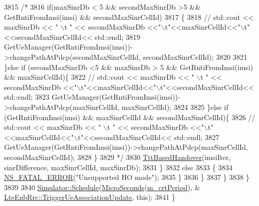 \begin{DoxyCode}
3815                 \textcolor{comment}{/*}
3816 \textcolor{comment}{                if(maxSinrDb < 5 && secondMaxSinrDb >5 && GetRntiFromImsi(imsi) && secondMaxSinrCellId)}
3817 \textcolor{comment}{                \{}
3818 \textcolor{comment}{                //      std::cout << maxSinrDb << " \(\backslash\)t " << secondMaxSinrDb
       <<"\(\backslash\)t"<<maxSinrCellId<<"\(\backslash\)t"<<secondMaxSinrCellId<< std::endl;}
3819 \textcolor{comment}{                        GetUeManager(GetRntiFromImsi(imsi))->changePathAtPdcp(secondMaxSinrCellId,
       secondMaxSinrCellId);}
3820 \textcolor{comment}{}
3821 \textcolor{comment}{                \}else if (secondMaxSinrDb <5 &&  maxSinrDb > 5 && GetRntiFromImsi(imsi) && maxSinrCellId)\{}
3822 \textcolor{comment}{                //      std::cout << maxSinrDb << " \(\backslash\)t " << secondMaxSinrDb
       <<"\(\backslash\)t"<<maxSinrCellId<<"\(\backslash\)t"<<secondMaxSinrCellId<< std::endl;}
3823 \textcolor{comment}{                           GetUeManager(GetRntiFromImsi(imsi))->changePathAtPdcp(maxSinrCellId,
       maxSinrCellId);}
3824 \textcolor{comment}{}
3825 \textcolor{comment}{                \}else if (GetRntiFromImsi(imsi) && maxSinrCellId && secondMaxSinrCellId)\{}
3826 \textcolor{comment}{                //      std::cout << maxSinrDb << " \(\backslash\)t " << secondMaxSinrDb
       <<"\(\backslash\)t"<<maxSinrCellId<<"\(\backslash\)t"<<secondMaxSinrCellId<< std::endl;}
3827 \textcolor{comment}{                                                
      GetUeManager(GetRntiFromImsi(imsi))->changePathAtPdcp(maxSinrCellId, secondMaxSinrCellId);}
3828 \textcolor{comment}{                \}}
3829 \textcolor{comment}{                                */}
3830           \hyperlink{classns3_1_1LteEnbRrc_a3f879b8dee06a9daf27e4c1b9f2a9099}{TttBasedHandover}(imsiIter, sinrDifference, maxSinrCellId, maxSinrDb);
3831         \}
3832         \textcolor{keywordflow}{else}
3833         \{
3834           \hyperlink{group__fatal_ga5131d5e3f75d7d4cbfd706ac456fdc85}{NS\_FATAL\_ERROR}(\textcolor{stringliteral}{"Unsupported HO mode"});
3835         \}
3836       \}
3837     \}
3838   \}
3839   
3840   \hyperlink{classns3_1_1Simulator_a671882c894a08af4a5e91181bf1eec13}{Simulator::Schedule}(\hyperlink{group__timecivil_ga17465a639c8d1464e76538afdd78a9f0}{MicroSeconds}(\hyperlink{classns3_1_1LteEnbRrc_aace4582efc05d4990eaf4204aee468b7}{m\_crtPeriod}), &
      \hyperlink{classns3_1_1LteEnbRrc_a57692ec9ada180d2887bd4273b27b6ef}{LteEnbRrc::TriggerUeAssociationUpdate}, \textcolor{keyword}{this});
3841 \}
\end{DoxyCode}


